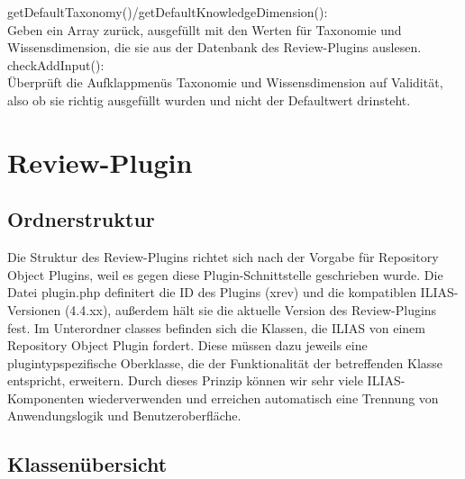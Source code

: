 \documentclass[a4paper]{scrreprt}
\begin{document}
getDefaultTaxonomy()/getDefaultKnowledgeDimension():\\
Geben ein Array zurück, ausgefüllt mit den Werten für Taxonomie und Wissensdimension, die sie aus der Datenbank des Review-Plugins auslesen.\\

checkAddInput():\\
Überprüft die Aufklappmenüs Taxonomie und Wissensdimension auf Validität, also ob sie richtig ausgefüllt wurden und nicht der Defaultwert drinsteht.\\


\section{Review-Plugin}

\subsection{Ordnerstruktur}

Die Struktur des Review-Plugins richtet sich nach der Vorgabe für Repository Object Plugins, weil es gegen diese Plugin-Schnittstelle geschrieben wurde. Die Datei plugin.php definitert die ID des Plugins (xrev) und die kompatiblen ILIAS-Versionen (4.4.xx), außerdem hält sie die aktuelle Version des Review-Plugins fest.
Im Unterordner classes befinden sich die Klassen, die ILIAS von einem Repository Object Plugin fordert. 
Diese müssen dazu jeweils eine plugintypspezifische Oberklasse, die der Funktionalität der betreffenden Klasse entspricht, erweitern. 
Durch dieses Prinzip können wir sehr viele ILIAS-Komponenten wiederverwenden und erreichen automatisch eine Trennung von Anwendungslogik und Benutzeroberfläche.

\subsection{Klassenübersicht}
\end{document}
